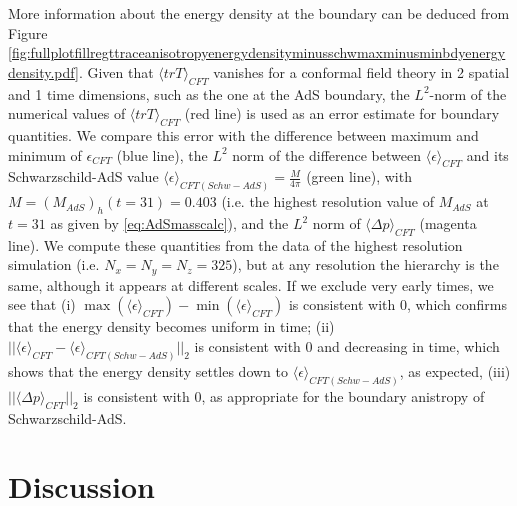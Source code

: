 \documentclass[a4paper,11pt]{article}
\numberwithin{equation}{section}
\begin{document}
More information about the energy density at the boundary can be deduced from Figure \ref{fig:fullplotfillregttraceanisotropyenergydensityminusschwmaxminusminbdyenergydensity.pdf}. Given that $\langle trT\rangle_{CFT}$ vanishes for a conformal field theory in 2 spatial and 1 time dimensions, such as the one at the AdS boundary, the $L^2$-norm of the numerical values of $\langle trT\rangle_{CFT}$ (red line) is used as an error estimate for boundary quantities. We compare this error with the difference between maximum and minimum of $\epsilon_{CFT}$ (blue line), the $L^2$ norm of the difference between $\langle\epsilon\rangle_{CFT}$ and its Schwarzschild-AdS value $\langle\epsilon\rangle_{CFT(Schw-AdS)}=\frac{M}{4\pi}$ (green line), with $M=(M_{AdS})_h(t=31)=0.403$ (i.e. the highest resolution value of $M_{AdS}$ at $t=31$ as given by \eqref{eq:AdSmasscalc}), and the $L^2$ norm of $\langle\Delta p\rangle_{CFT}$ (magenta line). We compute these quantities from the data of the highest resolution simulation (i.e. $N_x=N_y=N_z=325$), but at any resolution the hierarchy is the same, although it appears at different scales.
If we exclude very early times, we see that (i) $\max(\langle\epsilon\rangle_{CFT})-\min(\langle\epsilon\rangle_{CFT})$ is consistent with 0, which confirms that the energy density becomes uniform in time; (ii) $||\langle\epsilon\rangle_{CFT}-\langle\epsilon\rangle_{CFT(Schw-AdS)}||_2$ is consistent with 0 and decreasing in time, which shows that the energy density settles down to $\langle\epsilon\rangle_{CFT(Schw-AdS)}$, as expected, (iii) $||\langle\Delta p\rangle_{CFT}||_2$ is consistent with 0, as appropriate for the boundary anistropy of Schwarzschild-AdS.





\section{Discussion}\label{sec:Discussion}
\end{document}
